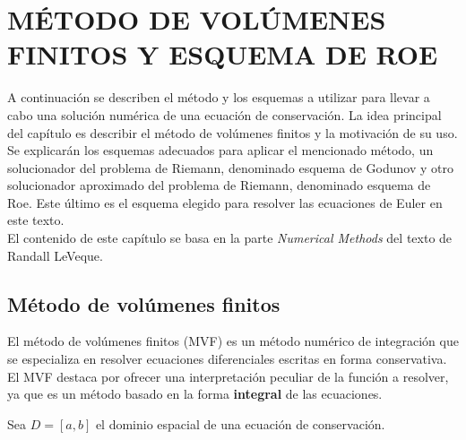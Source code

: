 \chapter{MÉTODO DE VOLÚMENES FINITOS Y ESQUEMA DE ROE}
A continuación se describen el método y los esquemas a utilizar para llevar a cabo una solución numérica de una ecuación de conservación. La idea principal del capítulo es describir el método de volúmenes finitos y la motivación de su uso. Se explicarán los esquemas adecuados para aplicar el mencionado método, un solucionador del problema de Riemann, denominado esquema de Godunov y otro solucionador aproximado del problema de Riemann, denominado esquema de Roe. Este último es el esquema elegido para resolver las ecuaciones de Euler en este texto.\\
El contenido de este capítulo se basa en la parte \textit{Numerical Methods} del texto \cite{Leveque} de Randall LeVeque.

\section{Método de volúmenes finitos}
El método de volúmenes finitos (MVF) es un método numérico de integración que se especializa en resolver ecuaciones diferenciales escritas en forma conservativa. El MVF destaca por ofrecer una interpretación peculiar de la función a resolver, ya que es un método basado en la forma \textbf{integral} de las ecuaciones.

Sea $D = [a,b]$ el dominio espacial de una ecuación de conservación.





%
